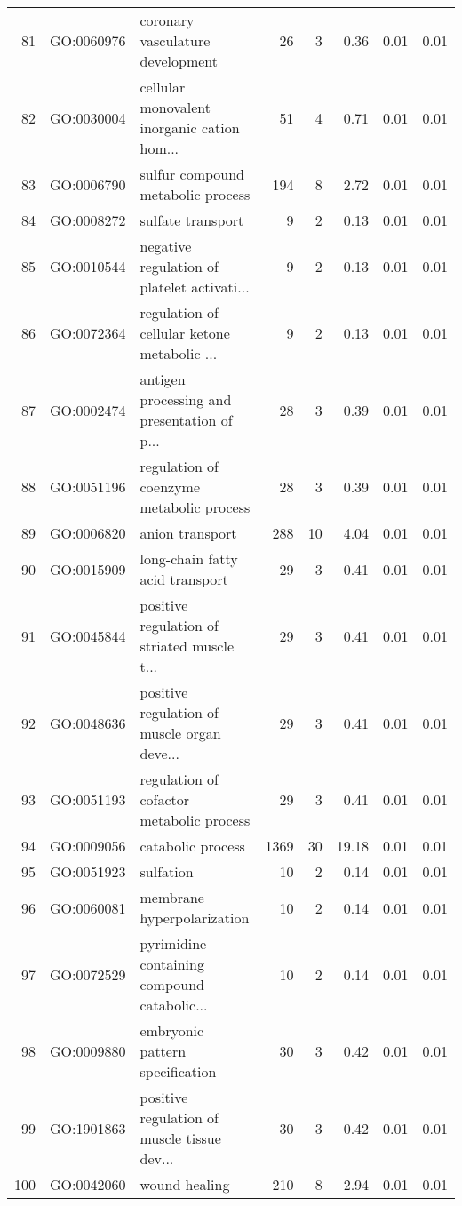 \begin{table}[ht]
\begin{tabular}{rllrrrrr}
  81 & GO:0060976 & coronary vasculature development &  26 &   3 & 0.36 & 0.01 & 0.01 \\ 
  82 & GO:0030004 & cellular monovalent inorganic cation hom... &  51 &   4 & 0.71 & 0.01 & 0.01 \\ 
  83 & GO:0006790 & sulfur compound metabolic process & 194 &   8 & 2.72 & 0.01 & 0.01 \\ 
  84 & GO:0008272 & sulfate transport &   9 &   2 & 0.13 & 0.01 & 0.01 \\ 
  85 & GO:0010544 & negative regulation of platelet activati... &   9 &   2 & 0.13 & 0.01 & 0.01 \\ 
  86 & GO:0072364 & regulation of cellular ketone metabolic ... &   9 &   2 & 0.13 & 0.01 & 0.01 \\ 
  87 & GO:0002474 & antigen processing and presentation of p... &  28 &   3 & 0.39 & 0.01 & 0.01 \\ 
  88 & GO:0051196 & regulation of coenzyme metabolic process &  28 &   3 & 0.39 & 0.01 & 0.01 \\ 
  89 & GO:0006820 & anion transport & 288 &  10 & 4.04 & 0.01 & 0.01 \\ 
  90 & GO:0015909 & long-chain fatty acid transport &  29 &   3 & 0.41 & 0.01 & 0.01 \\ 
  91 & GO:0045844 & positive regulation of striated muscle t... &  29 &   3 & 0.41 & 0.01 & 0.01 \\ 
  92 & GO:0048636 & positive regulation of muscle organ deve... &  29 &   3 & 0.41 & 0.01 & 0.01 \\ 
  93 & GO:0051193 & regulation of cofactor metabolic process &  29 &   3 & 0.41 & 0.01 & 0.01 \\ 
  94 & GO:0009056 & catabolic process & 1369 &  30 & 19.18 & 0.01 & 0.01 \\ 
  95 & GO:0051923 & sulfation &  10 &   2 & 0.14 & 0.01 & 0.01 \\ 
  96 & GO:0060081 & membrane hyperpolarization &  10 &   2 & 0.14 & 0.01 & 0.01 \\ 
  97 & GO:0072529 & pyrimidine-containing compound catabolic... &  10 &   2 & 0.14 & 0.01 & 0.01 \\ 
  98 & GO:0009880 & embryonic pattern specification &  30 &   3 & 0.42 & 0.01 & 0.01 \\ 
  99 & GO:1901863 & positive regulation of muscle tissue dev... &  30 &   3 & 0.42 & 0.01 & 0.01 \\ 
  100 & GO:0042060 & wound healing & 210 &   8 & 2.94 & 0.01 & 0.01 \\ 
   \hline
\end{tabular}
\end{table}
